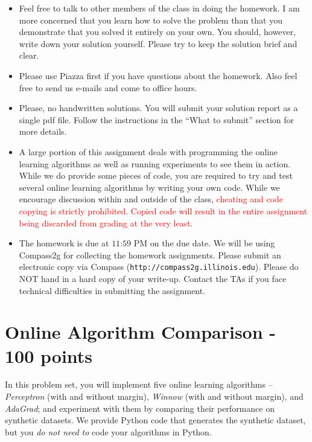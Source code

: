 
\usepackage{amsmath,amssymb,url,color}
\sloppy
\newcommand{\ignore}[1]{}

\oddsidemargin 0in
\evensidemargin 0in
\textwidth 6.5in
\topmargin -0.5in
\textheight 9.0in




\begin{footnotesize}
\begin{itemize}
\item Feel free to talk to other members of the class in doing the homework.
I am more concerned that you learn how to solve the problem than that you
demonstrate that you solved it entirely on your own.  You should, however,
write down your solution yourself.  Please try to keep the solution brief
and clear.

\item Please use Piazza first if you have questions about the homework.
Also feel free to send us e-mails and come to office hours.

\item Please, no handwritten solutions.  You will submit your solution
report as a single pdf file. Follow the instructions in the ``What to submit''
section for more details.

\item A large portion of this assignment deals with programming the online
learning algorithms as well as running experiments to see them in action.
While we do provide some pieces of code, you are required to try and test
several online learning algorithms by writing your own code.  While we
encourage discussion within and outside of the class,
\textcolor{red}{cheating and code copying is strictly prohibited.  Copied
code will result in the entire assignment being discarded from grading at
the very least.}

\item The homework is due at $11$:$59$ PM on the due date.  We will be using
Compass2g for collecting the homework assignments. Please submit an
electronic copy via Compass (\texttt{http://compass2g.illinois.edu}). Please
do NOT hand in a hard copy of your write-up.  Contact the TAs if you
  face technical difficulties in submitting the assignment.
\end{itemize}
\end{footnotesize}

\section*{Online Algorithm Comparison - 100 points}
In this problem set, you will implement five online learning
algorithms -- \emph{Perceptron} (with and without margin), 
\emph{Winnow} (with and without margin), and \emph{AdaGrad}; 
and experiment with them by comparing their performance on synthetic datasets. 
We provide Python code that generates the synthetic dataset, but you 
\emph{do not need to} code your algorithms in Python.

